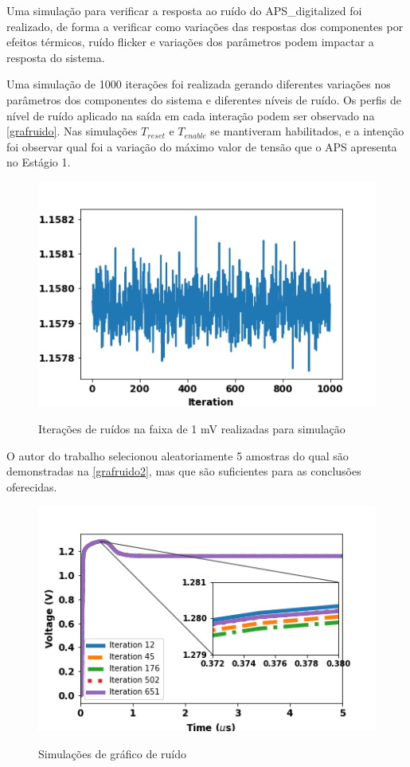 Uma simulação para verificar a resposta ao ruído do APS\_digitalized foi realizado, de forma a verificar como variações das respostas dos componentes por efeitos térmicos, ruído flicker e variações dos parâmetros podem impactar a resposta do sistema.

Uma simulação de 1000 iterações foi realizada gerando diferentes variações nos parâmetros dos componentes do sistema e diferentes níveis de ruído. Os perfis de nível de ruído aplicado na saída em cada interação podem ser observado na \autoref{grafruido}. Nas simulações $T_{reset}$ e $T_{enable}$ se mantiveram habilitados, e a intenção foi observar qual foi a variação do máximo valor de tensão que o APS apresenta no Estágio 1.

\begin{figure}[!h]
 \centering
    \caption{Iterações de ruídos na faixa de 1 mV realizadas para simulação} 
    \includegraphics[scale=0.6]{Resultados/Graficos/ruido-Vout_noise.png}
    \label{grafruido}
\end{figure}

O autor do trabalho selecionou aleatoriamente 5 amostras do qual são demonstradas na \autoref{grafruido2}, mas que são suficientes para as conclusões oferecidas.

\begin{figure}[!h]
 \centering
    \caption{Simulações de gráfico de ruído} 
    \includegraphics[scale=0.6]{Resultados/Graficos/tb_pixel_TRAN_NOISE.png}
    \label{grafruido2}
\end{figure}

